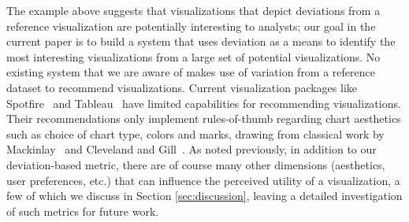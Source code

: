 




The example above suggests that visualizations that depict
deviations from a reference visualization are potentially interesting to analysts;
our goal in the current paper is to build a system 
that uses deviation as a means to identify
the most interesting visualizations from a large set of potential visualizations.
No existing system that we are aware of makes use of variation from a reference dataset
to recommend visualizations.  
Current visualization packages like Spotfire~\cite{Ahlberg:1996:SIE:245882.245893} and Tableau~\cite{tableau,polaris} have limited capabilities for 
recommending visualizations.
Their recommendations only implement rules-of-thumb 
regarding chart aesthetics such as choice of
chart type, colors and marks, drawing from
classical work by Mackinlay~\cite{Mackinlay:1986:ADG:22949.22950} and Cleveland and Gill~\cite{cleveland1984graphical}.
As noted previously, in addition to our deviation-based metric,
there are of course many other dimensions (aesthetics, user
preferences, etc.) that can influence the perceived utility of a
visualization, a few of which we discuss in Section
\ref{sec:discussion}, leaving a detailed investigation of such metrics
for future work.

